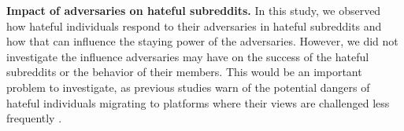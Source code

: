 \documentclass[10pt,twocolumn,letterpaper]{article}
\begin{document}
\textbf{Impact of adversaries on hateful subreddits.} In this study, we observed how hateful individuals respond to their adversaries in hateful subreddits and how that can influence the staying power of the adversaries. However, we did not investigate the influence adversaries may have on the success of the hateful subreddits or the behavior of their members. This would be an important problem to investigate, as previous studies warn of the potential dangers of hateful individuals migrating to platforms where their views are challenged less frequently \cite{johnson2019hidden, copland2020reddit, horta2021platform}.




{\small


}
\end{document}
